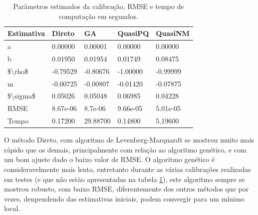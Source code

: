 \documentclass[]{book}
\newenvironment{Shaded}{\begin{snugshade}}{\end{snugshade}}
\newcommand{\KeywordTok}[1]{\textcolor[rgb]{0.13,0.29,0.53}{\textbf{#1}}}
\newcommand{\DataTypeTok}[1]{\textcolor[rgb]{0.13,0.29,0.53}{#1}}
\newcommand{\DecValTok}[1]{\textcolor[rgb]{0.00,0.00,0.81}{#1}}
\newcommand{\StringTok}[1]{\textcolor[rgb]{0.31,0.60,0.02}{#1}}
\newcommand{\OtherTok}[1]{\textcolor[rgb]{0.56,0.35,0.01}{#1}}
\newcommand{\OperatorTok}[1]{\textcolor[rgb]{0.81,0.36,0.00}{\textbf{#1}}}
\newcommand{\NormalTok}[1]{#1}
\begin{document}
\begin{Shaded}
\end{Shaded}

\begin{table}[t]

\caption{\label{tab:tabela}Parâmetros estimados da calibração, RMSE e tempo de computação em segundos.}
\centering
\fontsize{18}{20}\selectfont
\begin{tabular}{lllll}
\toprule
Estimativa & Direto & GA & QuasiPQ & QuasiNM\\
\midrule
a & 0.00000 & 0.00001 & 0.00000 & 0.00000\\
b & 0.01950 & 0.01954 & 0.01749 & 0.08475\\
\$\textbackslash{}rho\$ & -0.79529 & -0.80676 & -1.00000 & -0.99999\\
m & -0.00725 & -0.00807 & -0.01420 & -0.07875\\
\$\textbackslash{}sigma\$ & 0.05026 & 0.05048 & 0.06985 & 0.04228\\
\addlinespace
RMSE & 8.67e-06 & 8.7e-06 & 9.66e-05 & 5.01e-05\\
Tempo & 0.17200 & 29.88700 & 0.14800 & 5.19600\\
\bottomrule
\end{tabular}
\end{table}

O método Direto, com algoritmo de Levenberg-Marquardt se mostrou muito
mais rápido que os demais, principalmente com relação ao algoritmo
genético, e com um bom ajuste dado o baixo valor de RMSE. O algoritmo
genético é consideravelmente mais lento, entretanto durante as várias
calibrações realizadas em testes (e que não estão apresentadas na tabela
\ref{tab:tabela}), este algoritmo sempre se mostrou robusto, com baixo
RMSE, diferentemente dos outros métodos que por vezes, denpendendo das
estimativas iniciais, podem convergir para um mínimo local.
\end{document}
